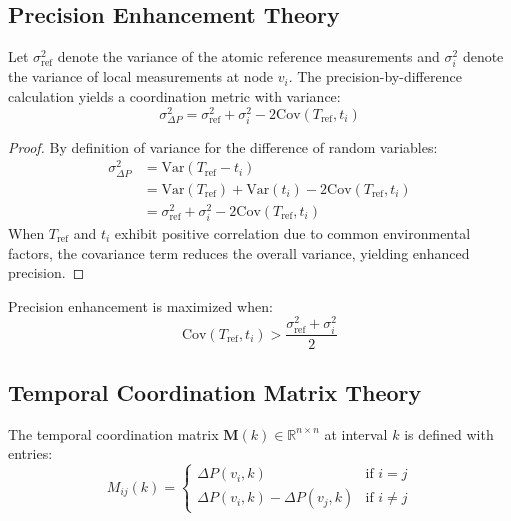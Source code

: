 \subsection{Precision Enhancement Theory}

\begin{theorem}
Let $\sigma_{\text{ref}}^2$ denote the variance of the atomic reference measurements and $\sigma_i^2$ denote the variance of local measurements at node $v_i$. The precision-by-difference calculation yields a coordination metric with variance:
\begin{equation}
\sigma_{\Delta P}^2 = \sigma_{\text{ref}}^2 + \sigma_i^2 - 2\text{Cov}(T_{\text{ref}}, t_i)
\end{equation}
\end{theorem}

\begin{proof}
By definition of variance for the difference of random variables:
\begin{align}
\sigma_{\Delta P}^2 &= \text{Var}(T_{\text{ref}} - t_i) \\
&= \text{Var}(T_{\text{ref}}) + \text{Var}(t_i) - 2\text{Cov}(T_{\text{ref}}, t_i) \\
&= \sigma_{\text{ref}}^2 + \sigma_i^2 - 2\text{Cov}(T_{\text{ref}}, t_i)
\end{align}
When $T_{\text{ref}}$ and $t_i$ exhibit positive correlation due to common environmental factors, the covariance term reduces the overall variance, yielding enhanced precision.
\end{proof}

\begin{corollary}
Precision enhancement is maximized when:
\begin{equation}
\text{Cov}(T_{\text{ref}}, t_i) > \frac{\sigma_{\text{ref}}^2 + \sigma_i^2}{2}
\end{equation}
\end{corollary}

\subsection{Temporal Coordination Matrix Theory}

\begin{definition}
The temporal coordination matrix $\mathbf{M}(k) \in \mathbb{R}^{n \times n}$ at interval $k$ is defined with entries:
\begin{equation}
M_{ij}(k) = \begin{cases}
\Delta P(v_i, k) & \text{if } i = j \\
\Delta P(v_i, k) - \Delta P(v_j, k) & \text{if } i \neq j
\end{cases}
\end{equation}
\end{definition}


